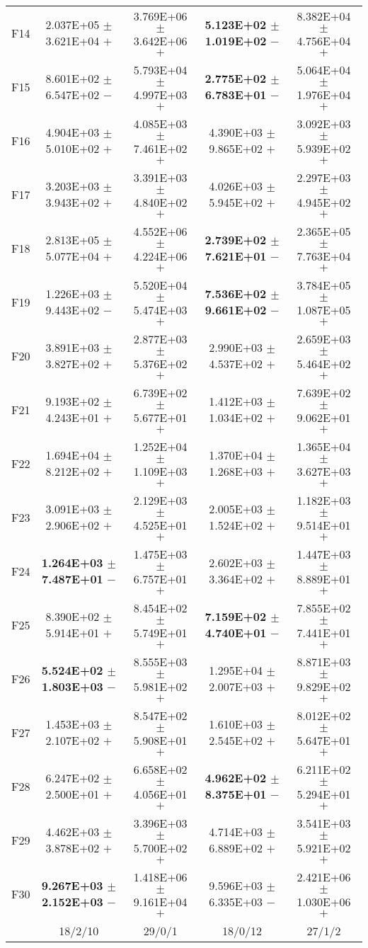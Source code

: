 \documentclass[paper]{ieice}
\begin{document}
\begin{table*}[htbp]
\begin{tabular}{c|c|c|c|c}
		F14	&	2.037E+05	$\pm$	3.621E+04	$+$	&	3.769E+06	$\pm$	3.642E+06	$+$	&	\textbf{5.123E+02	$\pm$	1.019E+02}	$-$	&	8.382E+04	$\pm$	4.756E+04	$+$	\\
		F15	&	8.601E+02	$\pm$	6.547E+02	$-$	&	5.793E+04	$\pm$	4.997E+03	$+$	&	\textbf{2.775E+02	$\pm$	6.783E+01}	$-$	&	5.064E+04	$\pm$	1.976E+04	$+$	\\
		F16	&	4.904E+03	$\pm$	5.010E+02	$+$	&	4.085E+03	$\pm$	7.461E+02	$+$	&	4.390E+03	$\pm$	9.865E+02	$+$	&	3.092E+03	$\pm$	5.939E+02	$+$	\\
		F17	&	3.203E+03	$\pm$	3.943E+02	$+$	&	3.391E+03	$\pm$	4.840E+02	$+$	&	4.026E+03	$\pm$	5.945E+02	$+$	&	2.297E+03	$\pm$	4.945E+02	$+$	\\
		F18	&	2.813E+05	$\pm$	5.077E+04	$+$	&	4.552E+06	$\pm$	4.224E+06	$+$	&	\textbf{2.739E+02	$\pm$	7.621E+01}	$-$	&	2.365E+05	$\pm$	7.763E+04	$+$	\\
		F19	&	1.226E+03	$\pm$	9.443E+02	$-$	&	5.520E+04	$\pm$	5.474E+03	$+$	&	\textbf{7.536E+02	$\pm$	9.661E+02}	$-$	&	3.784E+05	$\pm$	1.087E+05	$+$	\\
		F20	&	3.891E+03	$\pm$	3.827E+02	$+$	&	2.877E+03	$\pm$	5.376E+02	$+$	&	2.990E+03	$\pm$	4.537E+02	$+$	&	2.659E+03	$\pm$	5.464E+02	$+$	\\
		F21	&	9.193E+02	$\pm$	4.243E+01	$+$	&	6.739E+02	$\pm$	5.677E+01	$+$	&	1.412E+03	$\pm$	1.034E+02	$+$	&	7.639E+02	$\pm$	9.062E+01	$+$	\\
		F22	&	1.694E+04	$\pm$	8.212E+02	$+$	&	1.252E+04	$\pm$	1.109E+03	$+$	&	1.370E+04	$\pm$	1.268E+03	$+$	&	1.365E+04	$\pm$	3.627E+03	$+$	\\
		F23	&	3.091E+03	$\pm$	2.906E+02	$+$	&	2.129E+03	$\pm$	4.525E+01	$+$	&	2.005E+03	$\pm$	1.524E+02	$+$	&	1.182E+03	$\pm$	9.514E+01	$+$	\\
		F24	&	\textbf{1.264E+03	$\pm$	7.487E+01}	$-$	&	1.475E+03	$\pm$	6.757E+01	$+$	&	2.602E+03	$\pm$	3.364E+02	$+$	&	1.447E+03	$\pm$	8.889E+01	$+$	\\
		F25	&	8.390E+02	$\pm$	5.914E+01	$+$	&	8.454E+02	$\pm$	5.749E+01	$+$	&	\textbf{7.159E+02	$\pm$	4.740E+01}	$-$	&	7.855E+02	$\pm$	7.441E+01	$+$	\\
		F26	&	\textbf{5.524E+02	$\pm$	1.803E+03}	$-$	&	8.555E+03	$\pm$	5.981E+02	$+$	&	1.295E+04	$\pm$	2.007E+03	$+$	&	8.871E+03	$\pm$	9.829E+02	$+$	\\
		F27	&	1.453E+03	$\pm$	2.107E+02	$+$	&	8.547E+02	$\pm$	5.908E+01	$+$	&	1.610E+03	$\pm$	2.545E+02	$+$	&	8.012E+02	$\pm$	5.647E+01	$+$	\\
		F28	&	6.247E+02	$\pm$	2.500E+01	$+$	&	6.658E+02	$\pm$	4.056E+01	$+$	&	\textbf{4.962E+02	$\pm$	8.375E+01}	$-$	&	6.211E+02	$\pm$	5.294E+01	$+$	\\
		F29	&	4.462E+03	$\pm$	3.878E+02	$+$	&	3.396E+03	$\pm$	5.700E+02	$+$	&	4.714E+03	$\pm$	6.889E+02	$+$	&	3.541E+03	$\pm$	5.921E+02	$+$	\\
		F30	&	\textbf{9.267E+03	$\pm$	2.152E+03}	$-$	&	1.418E+06	$\pm$	9.161E+04	$+$	&	9.596E+03	$\pm$	6.335E+03	$-$	&	2.421E+06	$\pm$	1.030E+06	$+$	\\  \hline
		&	18/2/10				&	29/0/1				&	18/0/12				&	27/1/2				\\ \hline   
	\end{tabular}
\end{table*}
\end{document}
